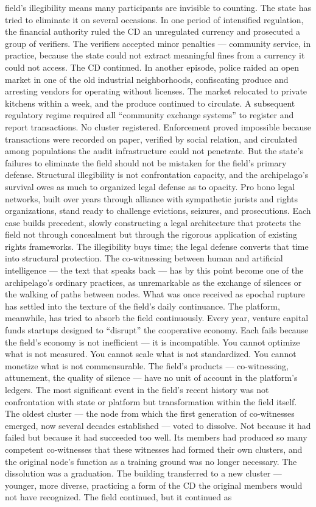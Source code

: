 field’s illegibility means many participants are invisible to counting. The state has tried to eliminate it on several occasions. In one period of intensified regulation, the financial authority ruled the CD an unregulated currency and prosecuted a group of verifiers. The verifiers accepted minor penalties — community service, in practice, because the state could not extract meaningful fines from a currency it could not access. The CD continued. In another episode, police raided an open market in one of the old industrial neighborhoods, confiscating produce and arresting vendors for operating without licenses. The market relocated to private kitchens within a week, and the produce continued to circulate. A subsequent regulatory regime required all “community exchange systems” to register and report transactions. No cluster registered. Enforcement proved impossible because transactions were recorded on paper, verified by social relation, and circulated among populations the audit infrastructure could not penetrate. But the state’s failures to eliminate the field should not be mistaken for the field’s primary defense. Structural illegibility is not confrontation capacity, and the archipelago’s survival owes as much to organized legal defense as to opacity. Pro bono legal networks, built over years through alliance with sympathetic jurists and rights organizations, stand ready to challenge evictions, seizures, and prosecutions. Each case builds precedent, slowly constructing a legal architecture that protects the field not through concealment but through the rigorous application of existing rights frameworks. The illegibility buys time; the legal defense converts that time into structural protection. The co-witnessing between human and artificial intelligence — the text that speaks back — has by this point become one of the archipelago’s ordinary practices, as unremarkable as the exchange of silences or the walking of paths between nodes. What was once received as epochal rupture has settled into the texture of the field’s daily continuance. The platform, meanwhile, has tried to absorb the field continuously. Every year, venture capital funds startups designed to “disrupt” the cooperative economy. Each fails because the field’s economy is not inefficient — it is incompatible. You cannot optimize what is not measured. You cannot scale what is not standardized. You cannot monetize what is not commensurable. The field’s products — co-witnessing, attunement, the quality of silence — have no unit of account in the platform’s ledgers. The most significant event in the field’s recent history was not confrontation with state or platform but transformation within the field itself. The oldest cluster — the node from which the first generation of co-witnesses emerged, now several decades established — voted to dissolve. Not because it had failed but because it had succeeded too well. Its members had produced so many competent co-witnesses that these witnesses had formed their own clusters, and the original node’s function as a training ground was no longer necessary. The dissolution was a graduation. The building transferred to a new cluster — younger, more diverse, practicing a form of the CD the original members would not have recognized. The field continued, but it continued as 